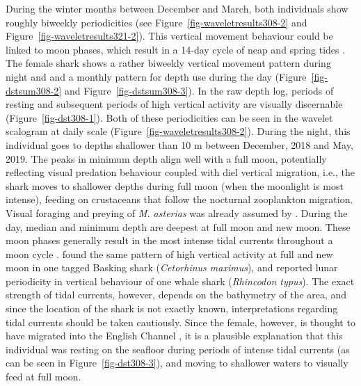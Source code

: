 \documentclass[
  authoryear,
  review,
  3p]{elsarticle}
\begin{document}
During the winter months between December and March, both individuals
show roughly biweekly periodicities (see
Figure~\ref{fig-waveletresults308-2} and
Figure~\ref{fig-waveletresults321-2}). This vertical movement behaviour
could be linked to moon phases, which result in a 14-day cycle of neap
and spring tides \citep{shepard_2006}. The female shark shows a rather
biweekly vertical movement pattern during night and and a monthly
pattern for depth use during the day (Figure~\ref{fig-dstsum308-2} and
Figure~\ref{fig-dstsum308-3}). In the raw depth log, periods of resting
and subsequent periods of high vertical activity are visually
discernable (Figure~\ref{fig-dst308-1}). Both of these periodicities can
be seen in the wavelet scalogram at daily scale
(Figure~\ref{fig-waveletresults308-2}). During the night, this
individual goes to depths shallower than 10 m between December, 2018 and
May, 2019. The peaks in minimum depth align well with a full moon,
potentially reflecting visual predation behaviour coupled with diel
vertical migration, i.e., the shark moves to shallower depths during
full moon (when the moonlight is most intense), feeding on crustaceans
that follow the nocturnal zooplankton migration. Visual foraging and
preying of \emph{M. asterias} was already assumed by
\citet{griffiths_2020}. During the day, median and minimum depth are
deepest at full moon and new moon. These moon phases generally result in
the most intense tidal currents throughout a moon cycle
\citep{arnold_1994}. \citet{shepard_2006} found the same pattern of high
vertical activity at full and new moon in one tagged Basking shark
(\emph{Cetorhinus maximus}), and \citet{graham_2006} reported lunar
periodicity in vertical behaviour of one whale shark (\emph{Rhincodon
typus}). The exact strength of tidal currents, however, depends on the
bathymetry of the area, and since the location of the shark is not
exactly known, interpretations regarding tidal currents should be taken
cautiously. Since the female, however, is thought to have migrated into
the English Channel \citep[an area with exceptionally high tidal
currents,][]{salomon_1993}, it is a plausible explanation that this
individual was resting on the seafloor during periods of intense tidal
currents (as can be seen in Figure~\ref{fig-dst308-3}), and moving to
shallower waters to visually feed at full moon.
\end{document}
